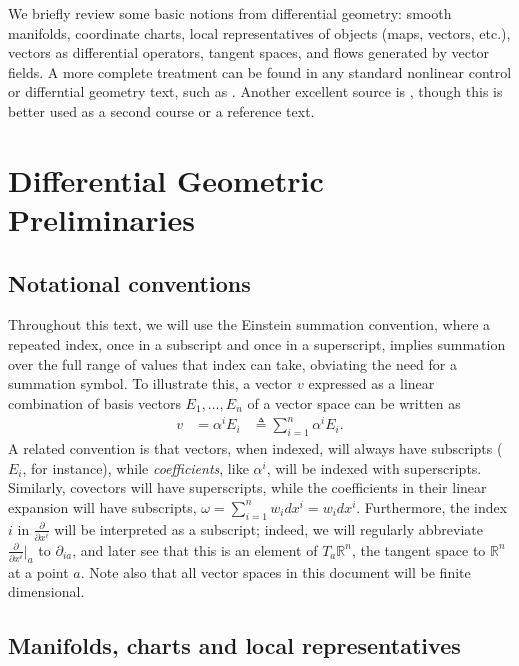 \documentclass[psamsfonts]{amsart}
\theoremstyle{definition}
\theoremstyle{remark}
\newcommand*\R{\mathds{R}}
\numberwithin{equation}{section}
\begin{document}
We briefly review some basic notions from differential geometry: smooth manifolds, coordinate charts, local representatives of objects (maps, vectors, etc.), vectors as differential operators, tangent spaces, and flows generated by vector fields. A more complete treatment can be found in any standard nonlinear control or differntial geometry text, such as \cite{nijmeijer_nonlinear_1990,boothby_2002}. Another excellent source is \cite{abraham_manifolds_1988}, though this is better used as a second course or a reference text. %

\section{Differential Geometric Preliminaries}
\subsection{Notational conventions}\label{sec:notationalconventions}
Throughout this text, we will use the Einstein summation convention, where a repeated index, once in a subscript and once in a superscript, implies summation over the full range of values that index can take, obviating the need for a summation symbol. To illustrate this, a vector $v$ expressed as a linear combination of basis vectors $E_1, \dots, E_n$ of a vector space can be written as
\begin{equation}\label{eq:esc}
\begin{aligned}
v & = {} \alpha^i E_i
&\triangleq{} \sum_{i = 1}^n \alpha^i E_i .
\end{aligned}
\end{equation}
A related convention is that vectors, when indexed, will always have subscripts ($E_i$, for instance), while \textit{coefficients}, like $\alpha^i$, will be indexed with superscripts. Similarly, covectors will have superscripts, while the coefficients in their linear expansion will have subscripts, $\omega  = \sum_{i = 1}^n w_i dx^i = w_i dx^i$. Furthermore, the index $i$ in $\frac{\partial}{\partial x^i}$ will be interpreted as a subscript; indeed, we will regularly abbreviate $\frac{\partial}{\partial x^i}\bigr|_a$ to $\partial_{ia}$, and later see that this is an element of $T_a\R^n$, the tangent space to $\R^n$ at a point $a$. Note also that all vector spaces in this document will be finite dimensional. 

\subsection{Manifolds, charts and local representatives}
\end{document}
